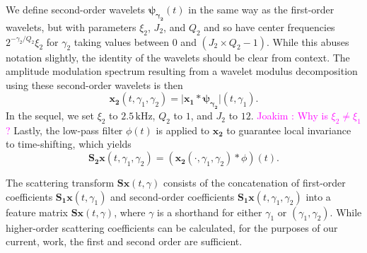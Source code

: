 \documentclass[journal]{IEEEtran}
\newcommand{\ja}[1]{\textcolor{magenta}{Joakim : #1}}
\begin{document}
We define second-order wavelets $\boldsymbol{\psi_{\gamma_2}}(t)$ in the same way as the first-order wavelets, but with parameters $\xi_2$, $J_2$, and $Q_2$ and so have center frequencies $2^{-\gamma_2/Q_2}\xi_2$ for $\gamma_2$ taking values between $0$ and $(J_2 \times Q_2 - 1)$. While this abuses notation slightly, the identity of the wavelets should be clear from context.
The amplitude modulation spectrum resulting from a wavelet modulus decomposition using these second-order wavelets is then
\begin{equation}
\boldsymbol{x_2}(t,\gamma_1,\gamma_2) =
\vert \boldsymbol{x_1} \ast \boldsymbol{\psi_{\gamma_2}} \vert(t,\gamma_1).
\end{equation}
In the sequel, we set $\xi_2$ to $2.5\,\mathrm{kHz}$, $Q_2$ to $1$, and $J_2$ to $12$. \ja{Why is $\xi_2 \neq \xi_1$?} Lastly, the low-pass filter $\phi(t)$ is applied to $\boldsymbol{x_2}$ to guarantee local invariance to time-shifting, which yields
\begin{equation}
\mathbf{S_2}\boldsymbol{x}(t,\gamma_1,\gamma_2) =
(\boldsymbol{x_2}(\cdot,\gamma_1,\gamma_2) \ast \phi)(t).
\end{equation}

The scattering transform $\mathbf{S}\boldsymbol{x}(t,\gamma)$ consists of the concatenation of first-order coefficients $\mathbf{S_1}\boldsymbol{x}(t,\gamma_1)$ and second-order coefficients $\mathbf{S_1}\boldsymbol{x}(t,\gamma_1,\gamma_2)$ into a feature matrix $\mathbf{S}\boldsymbol{x}(t,\gamma)$, where $\gamma$ is a shorthand for either $\gamma_1$ or $(\gamma_1,\gamma_2)$. While higher-order scattering coefficients can be calculated, for the purposes of our current, work, the first and second order are sufficient.
\end{document}

